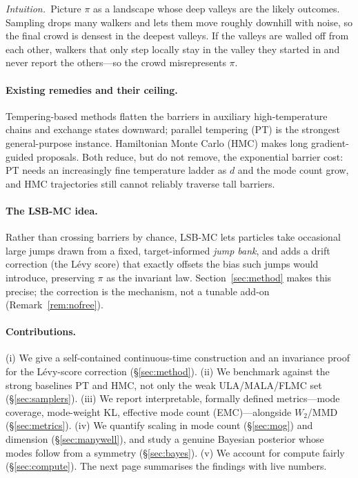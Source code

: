 \documentclass[11pt]{article}
\theoremstyle{plain}
\theoremstyle{remark}
\newcommand{\plainwords}[1]{\begin{plainbox}\noindent\textit{Intuition.\ }#1\end{plainbox}}
\begin{document}
\plainwords{Picture $\pi$ as a landscape whose deep valleys are the likely
outcomes. Sampling drops many walkers and lets them move roughly downhill with
noise, so the final crowd is densest in the deepest valleys. If the valleys are
walled off from each other, walkers that only step locally stay in the valley they
started in and never report the others---so the crowd misrepresents $\pi$.}

\paragraph{Existing remedies and their ceiling.} Tempering-based methods flatten
the barriers in auxiliary high-temperature chains and exchange states downward;
parallel tempering (PT) \cite{geyer1991,earldeem2005} is the strongest
general-purpose instance. Hamiltonian Monte Carlo (HMC) \cite{duane1987,neal2011}
makes long gradient-guided proposals. Both reduce, but do not remove, the
exponential barrier cost: PT needs an increasingly fine temperature ladder as $d$
and the mode count grow, and HMC trajectories still cannot reliably traverse tall
barriers.

\paragraph{The LSB-MC idea.} Rather than crossing barriers by chance, LSB-MC lets
particles take occasional large jumps drawn from a fixed, target-informed
\emph{jump bank}, and adds a drift correction (the L\'evy score) that exactly
offsets the bias such jumps would introduce, preserving $\pi$ as the invariant
law. Section~\ref{sec:method} makes this precise; the correction is the mechanism,
not a tunable add-on (Remark~\ref{rem:nofree}).

\paragraph{Contributions.} (i) We give a self-contained continuous-time
construction and an invariance proof for the L\'evy-score correction
(\S\ref{sec:method}). (ii) We benchmark against the strong baselines PT and HMC,
not only the weak ULA/MALA/FLMC set (\S\ref{sec:samplers}). (iii) We report
interpretable, formally defined metrics---mode coverage, mode-weight KL, effective
mode count (EMC)---alongside $W_2$/MMD (\S\ref{sec:metrics}). (iv) We quantify
scaling in mode count (\S\ref{sec:mog}) and dimension (\S\ref{sec:manywell}), and
study a genuine Bayesian posterior whose modes follow from a symmetry
(\S\ref{sec:bayes}). (v) We account for compute fairly (\S\ref{sec:compute}). The
next page summarises the findings with live numbers.
\end{document}
